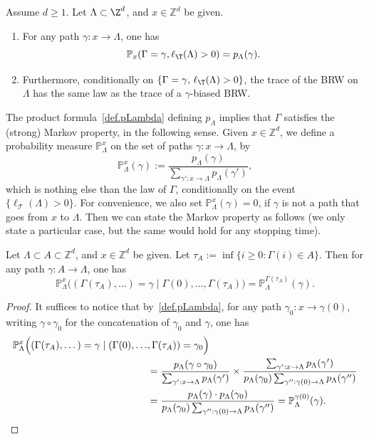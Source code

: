 \begin{proposition} \label{prop.Zhu.spine}
Assume $d\ge 1$. Let $\Lambda\subset \Z^d$,
and $x\in \mathbb Z^d$ be given.
\begin{enumerate}
\item For any path $\gamma:x\to \Lambda$, one has
\begin{equation*}%
\mathbb P_x(\Gamma = \gamma, \ell_{\T}(\Lambda)>0)=p_\Lambda(\gamma).
\end{equation*}
\item Furthermore, conditionally on $\{\Gamma=\gamma,\,
\ell_{\T}(\Lambda)>0\}$, the trace of the BRW
on $\Lambda$ has the same law as the trace of a $\gamma$-biased BRW.
\end{enumerate}
\end{proposition}
The product formula~\eqref{def.pLambda}
defining $p_\Lambda$ implies that $\Gamma$ satisfies the (strong)
Markov property, in the following sense.
Given $x\in \mathbb Z^d$, we define a probability measure $\mathbb P_\Lambda^x$ on the set of paths $\gamma:x\to \Lambda$, by
\[
\mathbb P_\Lambda^x(\gamma ) := \frac{p_\Lambda(\gamma)}{\sum_{\gamma':x\to \Lambda} p_\Lambda(\gamma')},
\]
which is nothing else than the law of $\Gamma$,
conditionally on the event $\{\ell_{\mathcal T}(\Lambda)>0\}$. For convenience, we also set $\mathbb P_\Lambda^x(\gamma) = 0$, if $\gamma$ is not a path that goes from $x$ to $\Lambda$.
Then we can state the Markov property as follows
(we only state a particular case, but the same would hold
for any stopping time).
\begin{corollary}\label{cor.spine.Markov}
Let $\Lambda\!\subset\! A\!\subset\! \mathbb Z^d$, and $x\!\in\! \mathbb Z^d$ be given. Let \hbox{$\tau_A:=\inf\{i\ge 0 :\Gamma(i) \!\in\! A\}$}.
Then for any path $\gamma:A\to \Lambda$, one has
\[
\mathbb P_\Lambda^x\Big((\Gamma(\tau_A), \dots)
=\gamma\mid \Gamma(0),\dots,\Gamma(\tau_A) \Big)
= \mathbb P_\Lambda^{\Gamma(\tau_A)}(\gamma).
\]
\end{corollary}
\begin{proof}
It suffices to notice that by~\eqref{def.pLambda}, for any path $\gamma_0:x\to \gamma(0)$,
writing $\gamma\circ \gamma_0$ for the concatenation of $\gamma_0$ and $\gamma$, one has
\begin{align*}
\mathbb P_\Lambda^x\Big((\Gamma(\tau_A),\dots)= \gamma\mid (\Gamma(0),\dots&,\Gamma(\tau_A)) = \gamma_0 \Big) \\
& = \frac{p_\Lambda(\gamma\circ \gamma_0)}{\sum_{\gamma':x\to \Lambda}p_\Lambda(\gamma')} \times \frac{\sum_{\gamma':x\to \Lambda} p_\Lambda(\gamma')}{p_\Lambda(\gamma_0)\sum_{\gamma'':\gamma(0)\to \Lambda} p_\Lambda(\gamma'')}\\
& = \frac{p_\Lambda(\gamma)\cdot p_\Lambda(\gamma_0)}{p_\Lambda(\gamma_0)\sum_{\gamma'':\gamma(0)\to \Lambda} p_\Lambda(\gamma'')} = \mathbb P_\Lambda^{\gamma(0)}(\gamma).\qedhere
\end{align*}
\end{proof}

